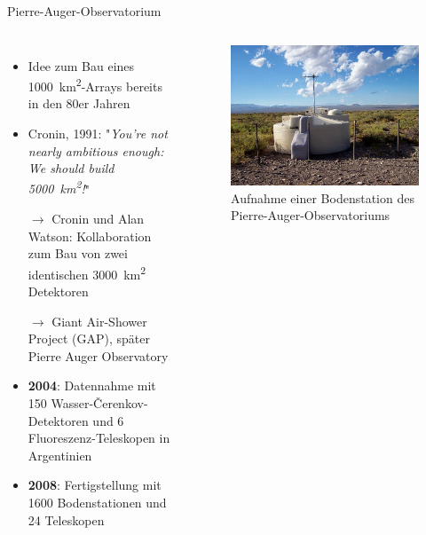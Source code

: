 \documentclass[aspectratio=1610, professionalfonts, 9pt, hyperref={colorlinks=false}]{beamer}
\begin{document}
\begin{frame}{Pierre-Auger-Observatorium}
  \begin{columns}
      \begin{itemize}
        \setlength\itemsep{0.5em}
        \item Idee zum Bau eines \SI{1000}{\kilo\metre\squared}-Arrays bereits in den 80er Jahren
        \item Cronin, 1991: "\emph{You’re not nearly ambitious enough: We should build \SI{5000}{\kilo\metre\squared}!}"
        \item[$\rightarrow$] Cronin und Alan Watson: Kollaboration zum Bau von zwei identischen \SI{3000}{\kilo\metre\squared} Detektoren
        \item[$\rightarrow$] Giant Air-Shower Project (GAP), später Pierre Auger Observatory
        \item \textbf{2004}: Datennahme mit 150 Wasser-Čerenkov-Detektoren und 6 Fluoreszenz-Teleskopen in Argentinien
        \item \textbf{2008}: Fertigstellung mit 1600 Bodenstationen und 24 Teleskopen
      \end{itemize}
        \vspace*{10px}
  
      \begin{figure}
          \centering
          \includegraphics[width=\linewidth]{images/pierre.jpg}
          \caption{Aufnahme einer Bodenstation des Pierre-Auger-Observatoriums  \cite{pierre}}
      \end{figure}
  \end{columns}
\end{frame}
\end{document}

